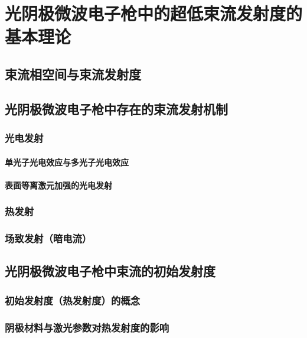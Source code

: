 \chapter{光阴极微波电子枪中的超低束流发射度的基本理论}
\label{chap:theory}

\section{束流相空间与束流发射度}

\section{光阴极微波电子枪中存在的束流发射机制}

\subsection{光电发射}

\subsubsection{单光子光电效应与多光子光电效应}

\subsubsection{表面等离激元加强的光电发射}

\subsection{热发射}

\subsection{场致发射（暗电流）}

\section{光阴极微波电子枪中束流的初始发射度}

\subsection{初始发射度（热发射度）的概念}

\subsection{阴极材料与激光参数对热发射度的影响}

